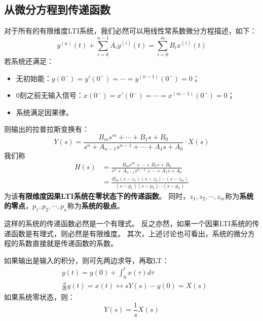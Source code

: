 \subsection{从微分方程到传递函数}

\begin{definition}[传递函数]
对于所有的有限维度LTI系统，我们必然可以用线性常系数微分方程描述，如下：
\[
y^{\left( n \right)}\left( t \right) +\sum_{i=0}^{n-1}{A_iy^{\left( i \right)}\left( t \right)}=\sum_{i=0}^m{B_ix^{\left( i \right)}\left( t \right)}
\]
若系统还满足：
\begin{itemize}
    \item 无初始能：$y\left( 0^- \right) =y'\left( 0^- \right) =\cdots =y^{\left( n-1 \right)}\left( 0^- \right) =0$；
    \item 0刻之前无输入信号：$x\left( 0^- \right) =x'\left( 0^- \right) =\cdots =x^{\left( m-1 \right)}\left( 0^- \right) =0$；
    \item 系统满足因果律。
\end{itemize}
则输出的拉普拉斯变换有：
\[
Y\left( s \right) =\frac{B_ms^m+\cdots +B_1s+B_0}{s^n+A_{n-1}s^{n-1}+\cdots +A_1s+A_0}\cdot X\left( s \right)
\]
我们称
\begin{align*}
H\left( s \right) &=\frac{B_ms^m+\cdots +B_1s+B_0}{s^n+A_{n-1}s^{n-1}+\cdots +A_1s+A_0} \\
&=\frac{B_m\left( s-z_1 \right) \left( s-z_2 \right) \cdots \left( s-z_m \right)}{\left( s-p_1 \right) \left( s-p_2 \right) \cdots \left( s-p_n \right)}
\end{align*}
为该{\bf 有限维度因果LTI系统在零状态下的传递函数}。
同时，$z_1,z_2,\cdots ,z_m$称为{\bf 系统的零点}，$p_1,p_2,\cdots ,p_n$称为{\bf 系统的极点}。
\end{definition}

这样的系统的传递函数必然是一个有理式。
反之亦然，如果一个因果LTI系统的传递函数是有理式，则必然是有限维度。
其次，上述讨论也可看出，系统的微分方程的系数直接就是传递函数的系数。

如果输出是输入的积分，则可先两边求导，再取LT：
\begin{align*}
&y\left( t \right) =y\left( 0 \right) +\int_0^t{x\left( \tau \right) d\tau} \\
&\frac{d}{dt}y\left( t \right) =x\left( t \right) \leftrightarrow sY\left( s \right) -y\left( 0 \right) =X\left( s \right)
\end{align*}
如果系统零状态，则：
\[
Y\left( s \right) =\frac{1}{s}X\left( s \right)
\]

